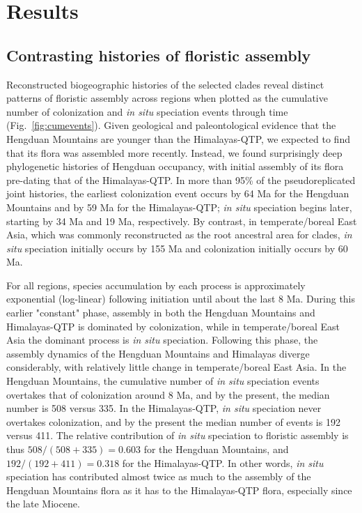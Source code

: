\documentclass[9pt,twocolumn,twoside,lineno]{pnas-new}
\begin{document}
\section*{Results}

\subsection*{Contrasting histories of floristic assembly}

Reconstructed biogeographic histories of the selected clades reveal
distinct patterns of floristic assembly across regions when plotted as
the cumulative number of colonization and \textit{in situ} speciation
events through time (Fig.~\ref{fig:cumevents}). Given geological and
paleontological evidence that the Hengduan Mountains are younger than
the Himalayas-QTP, we expected to find that its flora was assembled
more recently. Instead, we found surprisingly deep phylogenetic
histories of Hengduan occupancy, with initial assembly of its flora
pre-dating that of the Himalayas-QTP. In more than 95\% of the
pseudoreplicated joint histories, the earliest colonization event
occurs by 64 Ma for the Hengduan Mountains and by 59 Ma for the
Himalayas-QTP; \textit{in situ} speciation begins later, starting by
34 Ma and 19 Ma, respectively. By contrast, in temperate/boreal East
Asia, which was commonly reconstructed as the root ancestral area for
clades, \textit{in situ} speciation initially occurs by 155 Ma and
colonization initially occurs by 60 Ma.

For all regions, species accumulation by each process is approximately
exponential (log-linear) following initiation until about the last 8
Ma. During this earlier "constant" phase, assembly in both the
Hengduan Mountains and Himalayas-QTP is dominated by colonization,
while in temperate/boreal East Asia the dominant process is \textit{in
  situ} speciation. Following this phase, the assembly dynamics of the
Hengduan Mountains and Himalayas diverge considerably, with relatively
little change in temperate/boreal East Asia. In the Hengduan
Mountains, the cumulative number of \textit{in situ} speciation events
overtakes that of colonization around 8 Ma, and by the present, the
median number is 508 versus 335. In the Himalayas-QTP, \textit{in
  situ} speciation never overtakes colonization, and by the present
the median number of events is 192 versus 411. The relative
contribution of \textit{in situ} speciation to floristic assembly is
thus $508/(508+335) = 0.603$ for the Hengduan Mountains, and
$192/(192+411) = 0.318$ for the Himalayas-QTP. In other words,
\textit{in situ} speciation has contributed almost twice as much to
the assembly of the Hengduan Mountains flora as it has to the
Himalayas-QTP flora, especially since the late Miocene.
\end{document}
